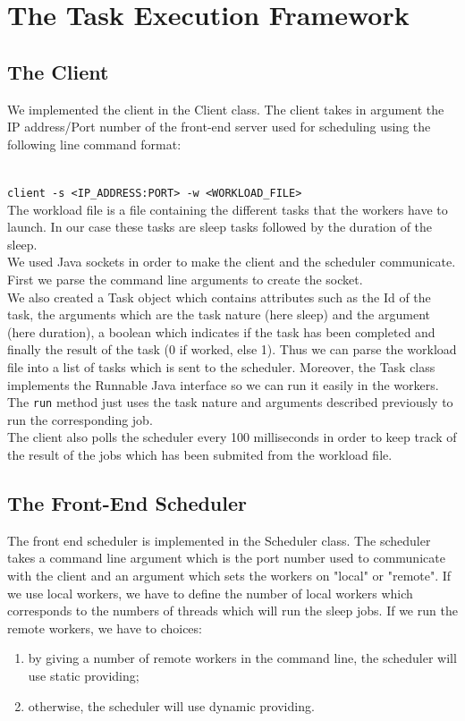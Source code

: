 \documentclass{article}
\begin{document}
\section{The Task Execution Framework}
\subsection{The Client}
We implemented the client in the Client class. The client takes in argument the IP address/Port number of the front-end server used for scheduling using the following line command format:

\\
\verb+client -s <IP_ADDRESS:PORT> -w <WORKLOAD_FILE>+
\\

The workload file is a file containing the different tasks that the workers have to launch. In our case these tasks are sleep tasks followed by the duration of the sleep.\\

We used Java sockets in order to make the client and the scheduler communicate. First we parse the command line arguments to create the socket.\\

We also created a Task object which contains attributes such as the Id of the task, the arguments which are the task nature (here sleep) and the argument (here duration), a boolean which indicates if the task has been completed and finally the result of the task (0 if worked, else 1). Thus we can parse the workload file into a list of tasks which is sent to the scheduler. Moreover, the Task class implements the Runnable Java interface so we can run it easily in the workers. The \verb+run+ method just uses the task nature and arguments described previously to run the corresponding job.\\

The client also polls the scheduler every 100 milliseconds in order to keep track of the result of the jobs which has been submited from the workload file.

\subsection{The Front-End Scheduler}
The front end scheduler is implemented in the Scheduler class. 
The scheduler takes a command line argument which is the port number used to communicate with the client and an argument which sets the workers on "local" or "remote". If we use local workers, we have to define the number of local workers which corresponds to the numbers of threads which will run the sleep jobs. If we run the remote workers, we have to choices:
\begin{enumerate}
	\item by giving a number of remote workers in the command line, the scheduler will use static providing;
	\item otherwise, the scheduler will use dynamic providing.
\end{enumerate}
\end{document}
